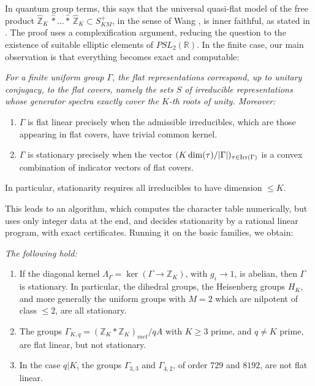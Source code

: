 \documentclass[12pt]{amsart}
\theoremstyle{definition}
\begin{document}
\medskip

In quantum group terms, this says that the universal quasi-flat model of the free product $\widehat{\mathbb Z}_K\,\widehat{*}\ldots\widehat{*}\,\widehat{\mathbb Z}_K\subset S_{KM}^+$, in the sense of Wang \cite{wa1}, is inner faithful, as stated in \cite{bfr}. The proof uses a complexification argument, reducing the question to the existence of suitable elliptic elements of $PSL_2(\mathbb R)$. In the finite case, our main observation is that everything becomes exact and computable:

\medskip

 {\em For a finite uniform group $\Gamma$, the flat representations correspond, up to unitary conjugacy, to the flat covers, namely the sets $S$ of irreducible representations whose generator spectra exactly cover the $K$-th roots of unity. Moreover:
\begin{enumerate}
\item $\Gamma$ is flat linear precisely when the admissible irreducibles, which are those appearing in flat covers, have trivial common kernel.

\item $\Gamma$ is stationary precisely when the vector $(K\dim(\tau)/|\Gamma|)_{\tau\in{\rm Irr}(\Gamma)}$ is a convex combination of indicator vectors of flat covers.
\end{enumerate}
In particular, stationarity requires all irreducibles to have dimension $\leq K$.}

\medskip

This leads to an algorithm, which computes the character table numerically, but uses only integer data at the end, and decides stationarity by a rational linear program, with exact certificates. Running it on the basic families, we obtain:

\medskip

 {\em The following hold:
\begin{enumerate}
\item If the diagonal kernel $\Lambda_\Gamma=\ker(\Gamma\to\mathbb Z_K)$, with $g_i\to1$, is abelian, then $\Gamma$ is stationary. In particular, the dihedral groups, the Heisenberg groups $H_K$, and more generally the uniform groups with $M=2$ which are nilpotent of class $\leq2$, are all stationary.

\item The groups $\Gamma_{K,q}=(\mathbb Z_K*\mathbb Z_K)_{met}/qA$ with $K\geq3$ prime, and $q\neq K$ prime, are flat linear, but not stationary.

\item In the case $q|K$, the groups $\Gamma_{3,3}$ and $\Gamma_{4,2}$, of order $729$ and $8192$, are not flat linear.
\end{enumerate}}
\end{document}
